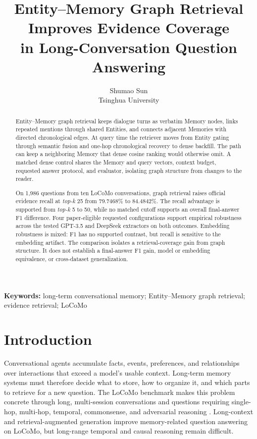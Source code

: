 \documentclass[10pt,twocolumn]{article}
\title{\textbf{Entity--Memory Graph Retrieval Improves Evidence Coverage\\
in Long-Conversation Question Answering}}
\author{Shumao Sun\\
\small Tsinghua University}
\date{}
\newcommand{\topk}{\textit{top-k}}
\begin{document}
\maketitle

\begin{abstract}
Entity--Memory graph retrieval keeps dialogue turns as verbatim Memory nodes,
links repeated mentions through shared Entities, and connects adjacent
Memories with directed chronological edges. At query time the retriever moves
from Entity gating through semantic fusion and one-hop chronological recovery
to dense backfill. The path can keep a neighboring Memory that dense cosine ranking
would otherwise omit. A matched dense control
shares the Memory and query vectors, context budget, requested answer
protocol, and evaluator, isolating graph structure from changes to the
reader.

On 1,986 questions from ten LoCoMo conversations, graph retrieval raises
official evidence recall at \topk{} 25 from 79.7468\% to 84.4842\%. The recall
advantage is supported from \topk{} 5 to 50, while no matched cutoff supports
an overall final-answer F1 difference. Four paper-eligible requested
configurations support empirical robustness across the tested GPT-3.5 and
DeepSeek extractors on both outcomes. Embedding robustness is mixed: F1 has
no supported contrast, but recall is sensitive to the embedding artifact.
The comparison isolates a retrieval-coverage gain from graph structure. It
does not establish a final-answer F1 gain, model or embedding equivalence, or
cross-dataset generalization.
\end{abstract}

\noindent\textbf{Keywords:} long-term conversational memory; Entity--Memory
graph retrieval; evidence retrieval; LoCoMo

\section{Introduction}

Conversational agents accumulate facts, events, preferences, and relationships
over interactions that exceed a model's usable context. Long-term memory
systems must therefore decide what to store, how to organize it, and which
parts to retrieve for a new question. The LoCoMo benchmark makes this problem
concrete through long, multi-session conversations and questions requiring
single-hop, multi-hop, temporal, commonsense, and adversarial reasoning
\citep{maharana2024locomo}. Long-context and retrieval-augmented generation
improve memory-related question answering on LoCoMo, but long-range temporal
and causal reasoning remain difficult.
\end{document}
